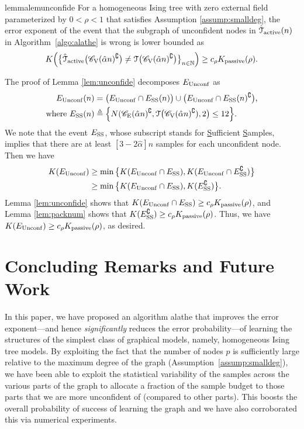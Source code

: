 \documentclass[11pt,onecolumn]{article}
\newcommand{\calT}{\mathcal{T}}
\newcommand{\hatcalT}{\hat{\calT}}
\newcommand{\bbN}{\mathbb{N}}
\newcommand{\scC}{\mathscr{C}}
\newcommand{\halpha}{\hat{\alpha}}
\newcommand{\Passive}{{\rm passive}}
\newcommand{\Active}{{\rm active}}
\begin{document}
\begin{restatable}{lemma}{lemunconfide}
\label{lem:unconfide}
For a homogeneous Ising tree with zero external field parameterized by $0<\rho<1$ that satisfies Assumption \ref{assump:smalldeg}, the error exponent of the event that the subgraph of unconfident nodes in $\hatcalT_{\Active}(n)$ in Algorithm~\ref{algo:alathe} is wrong is lower bounded as
\begin{align}
	K \Big(\big\{\hatcalT_{\Active}\big(\scC_{\mathrm{V}}(\halpha n)^{\complement}\big)\neq \calT\big(\scC_{\mathrm{V}}(\halpha n)^{\complement}\big)\big\}_{n\in\bbN}\Big)\geq c_{\rho}K _{\Passive}(\rho).
\end{align}
\end{restatable}
The proof of Lemma \ref{lem:unconfide} decomposes $E_{{\rm Unconf}}$ as
\begin{align}
	E_{{\rm Unconf}}(n)&=\big(E_{{\rm Unconf}}\cap E_{{\rm SS}}(n)\big)\cup \big(E_{{\rm Unconf}}\cap E_{{\rm SS}}(n)^{\complement}\big)\text{,}\\
	\text{where }E_{{\rm SS}}(n)&\triangleq\Big\{N(\scC_{\mathrm{E}}(\halpha n)^{\complement},\calT\big(\scC_{\mathrm{V}}(\halpha n)^{\complement}),2\big)\leq 12\Big\}.
\end{align}
We note that the event $E_{{\rm SS}}$, whose subscript stands for \underline{S}ufficient \underline{S}amples, implies that there are at least $[3-2\halpha]n$ samples for each unconfident node. Then we have
\begin{align}
	K (E_{{\rm Unconf}})&\geq \min \big\{K (E_{{\rm Unconf}}\cap E_{{\rm SS}}),K (E_{{\rm Unconf}}\cap E_{{\rm SS}}^{\complement})\big\}\\
	&\geq \min\big\{K (E_{{\rm Unconf}}\cap E_{{\rm SS}}),K (E_{{\rm SS}}^{\complement})\big\}.
\end{align}
Lemma \ref{lem:unconfide} shows that $K (E_{{\rm Unconf}}\cap E_{{\rm SS}})\geq c_{\rho}K _{\Passive}(\rho)$, and Lemma \ref{lem:packnum} shows that $K (E_{{\rm SS}}^{\complement})\geq c_{\rho}K _{\Passive}(\rho)$. Thus, we 
have $K (E_{{\rm Unconf}})\geq c_{\rho}K_{\Passive}(\rho)$, as desired.

\section{Concluding Remarks and Future Work} \label{sec:conclusion}
In this paper, we have proposed an algorithm \ac{alathe} that improves the error exponent---and hence {\em significantly} reduces the error probability---of learning the structures of the simplest class of graphical models, namely, homogeneous Ising tree models. By exploiting the fact that the number of nodes $p$ is sufficiently large relative to the maximum degree of the graph (Assumption~\ref{assump:smalldeg}), we have been able to  exploit the statistical variability of the samples across the various parts of the graph to allocate a fraction  of the sample budget to those parts  that we are more unconfident of  (compared to other parts). This boosts the overall probability of success of learning the graph and we have also  corroborated this via  numerical experiments. 
\end{document}
